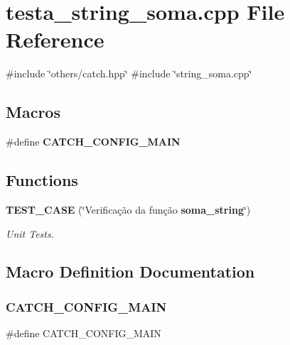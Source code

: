 \section{testa\+\_\+string\+\_\+soma.\+cpp File Reference}
\label{testa__string__soma_8cpp}
{\ttfamily \#include \char`\"{}others/catch.\+hpp\char`\"{}}\newline
{\ttfamily \#include \char`\"{}string\+\_\+soma.\+cpp\char`\"{}}\newline
\subsection*{Macros}
\begin{DoxyCompactItemize}
\item 
\#define \textbf{ C\+A\+T\+C\+H\+\_\+\+C\+O\+N\+F\+I\+G\+\_\+\+M\+A\+IN}
\end{DoxyCompactItemize}
\subsection*{Functions}
\begin{DoxyCompactItemize}
\item 
\textbf{ T\+E\+S\+T\+\_\+\+C\+A\+SE} (\char`\"{}Verificação da função \textbf{ soma\+\_\+string}\char`\"{})
\begin{DoxyCompactList}\small\item\em Unit Tests. \end{DoxyCompactList}\end{DoxyCompactItemize}


\subsection{Macro Definition Documentation}
\mbox{\label{testa__string__soma_8cpp_a656eb5868e824d59f489f910db438420}} 
\subsubsection{C\+A\+T\+C\+H\+\_\+\+C\+O\+N\+F\+I\+G\+\_\+\+M\+A\+IN}
{\footnotesize\ttfamily \#define C\+A\+T\+C\+H\+\_\+\+C\+O\+N\+F\+I\+G\+\_\+\+M\+A\+IN}




